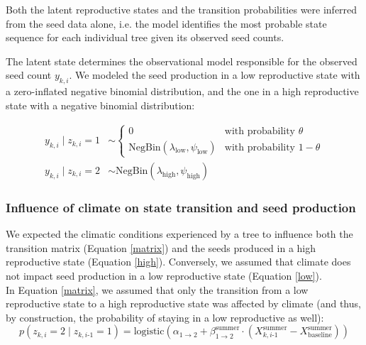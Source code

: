 \documentclass[11pt]{article}
\begin{document}
\noindent Both the latent reproductive states and the transition probabilities were inferred from the seed data alone, i.e. the model identifies the most probable state sequence for each individual tree given its observed seed counts.

The latent state determines the observational model responsible for the observed seed count $y_{k,i}$. We modeled the seed production in a low reproductive state with a zero-inflated negative binomial distribution, and the one in a high reproductive state with a negative binomial distribution: 

\begin{align}
\label{low}
y_{k,i} \mid z_{k,i} = 1 &\sim \begin{cases} 0 & \text{with probability } \theta \\ \text{NegBin}(\lambda_\text{low}, \psi_\text{low}) & \text{with probability } 1 - \theta \end{cases} \\[2pt]
\label{high} %
y_{k,i} \mid z_{k,i} = 2 &\sim \text{NegBin}(\lambda_\text{high}, \psi_\text{high})
\end{align}

\subsubsection*{Influence of climate on state transition and seed production}

We expected the climatic conditions experienced by a tree to influence both the transition matrix (Equation \ref{matrix}) and the seeds produced in a high reproductive state (Equation \ref{high}). Conversely, we assumed that climate does not impact seed production in a low reproductive state (Equation \ref{low}). \\
In Equation \ref{matrix}, we assumed that only the transition from a low reproductive state to a high reproductive state was affected by climate (and thus, by construction, the probability of staying in a low reproductive as well):
\begin{equation}
 p(z_{k,i} = 2 \mid z_{k,i\text{-}1} = 1) = \text{logistic} \left( \alpha_{1 \rightarrow 2} + \beta^\text{summer}_{1 \rightarrow 2} \cdot (X^\text{summer}_{k,i\text{-}1}-X^\text{summer}_\text{baseline}) \right)
\end{equation}
\end{document}
